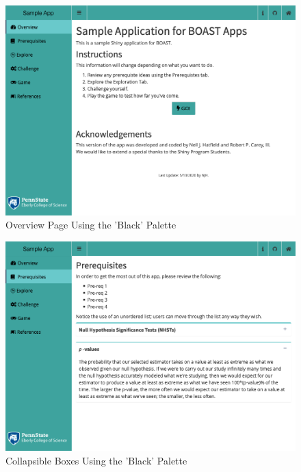 \documentclass[
]{book}
\begin{document}
\begin{figure}

{\centering \includegraphics[width=14in]{images/blackOverview} 

}

\caption{Overview Page Using the 'Black' Palette}\label{fig:blackAction1}
\end{figure}

\begin{figure}

{\centering \includegraphics[width=14in]{images/blackCollapse} 

}

\caption{Collapsible Boxes Using the 'Black' Palette}\label{fig:blackAction2}
\end{figure}
\end{document}
